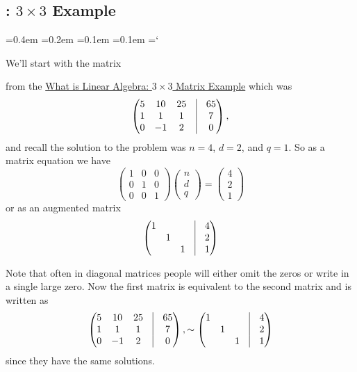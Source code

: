 
\subsection{\gaussElimTitle: $3 \times 3$ Example}

{\ttfamily
{}\font=0.4em
\font=0.2em
\font=0.1em
\font=0.1em
\hyphenchar\font=`\-

\hypertarget{scripts_gaussian_elimination_3_3_example}{We'll start with the matrix} from the \hyperlink{scripts_what_is_linear_algebra_3_3_matrix}{What is Linear Algebra: $3 \times 3$ Matrix Example} which was
\[
\begin{pmatrix}
5 & 10 & 25 & \vline & 65\\
1 & 1 & 1 & \vline & 7 \\
0 & -1 & 2 & \vline & 0
\end{pmatrix},
\]
and recall the solution to the problem was $n = 4$, $d = 2$, and $q = 1$. So as a matrix equation we have
\[
\begin{pmatrix}1 & 0 & 0 \\ 0 & 1 & 0 \\ 0 & 0 & 1\end{pmatrix} \begin{pmatrix}n \\ d \\ q\end{pmatrix} = \begin{pmatrix}4 \\ 2 \\ 1 \end{pmatrix}
\]
or as an augmented matrix
\[
\begin{pmatrix}
1 & & & \vline & 4 \\
& 1 & & \vline & 2 \\
& & 1 & \vline & 1
\end{pmatrix}
\]

Note that often in diagonal matrices people will either omit the zeros or write in a single large zero. Now
the first matrix is equivalent to the second matrix and is written as
\[
\begin{pmatrix}
5 & 10 & 25 & \vline & 65\\
1 & 1 & 1 & \vline & 7 \\
0 & -1 & 2 & \vline & 0
\end{pmatrix},
\sim
\begin{pmatrix}
1 & & & \vline & 4 \\
& 1 & & \vline & 2 \\
& & 1 & \vline & 1
\end{pmatrix}
\]
since they have the same solutions.


} %

\newpage
